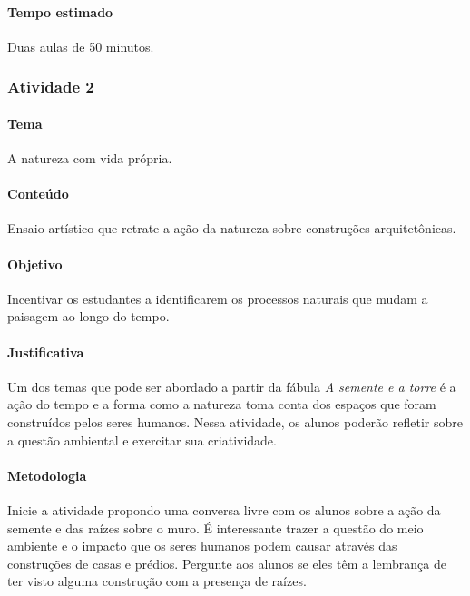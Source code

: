 \documentclass[11pt]{extarticle}
\begin{document}
\paragraph{Tempo estimado} Duas aulas de 50 minutos.

\subsubsection{Atividade 2}


\paragraph{Tema} A natureza com vida própria.

\paragraph{Conteúdo} Ensaio artístico que retrate a ação da natureza sobre construções arquitetônicas.

\paragraph{Objetivo} Incentivar os estudantes a identificarem os processos naturais que mudam a paisagem ao longo do tempo.

\paragraph{Justificativa} Um dos temas que pode ser abordado a partir da fábula \textit{A semente e a torre} é a ação do tempo e a forma como a natureza toma conta dos espaços que foram construídos pelos seres humanos. Nessa atividade, os alunos poderão refletir sobre a questão ambiental e exercitar sua criatividade.

\paragraph{Metodologia} Inicie a atividade propondo uma conversa livre com os alunos sobre a ação da semente e das raízes sobre o muro. É interessante trazer a questão do meio ambiente e o impacto que os seres humanos podem causar através das construções de casas e prédios. Pergunte aos alunos se eles têm a lembrança de ter visto alguma construção com a presença de raízes.
\end{document}
